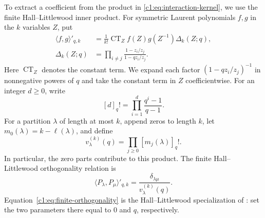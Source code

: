 \documentclass[12pt,reqno,a4paper]{amsart}
\numberwithin{equation}{section}
\numberwithin{figure}{section}
\theoremstyle{plain}
\theoremstyle{definition}
\begin{document}
To extract a coefficient from the product in \eqref{c1:eq:interaction-kernel},
we use the finite Hall--Littlewood inner product.  For symmetric
Laurent polynomials $f,g$ in the $k$ variables $Z$, put
\begin{equation}\label{c1:eq:finite-inner-product}
 \begin{aligned}
 \langle f,g\rangle'_{q,k}
 &=\frac1{k!}\operatorname{CT}_Z f(Z)g(Z^{-1})\Delta_k(Z;q),\\
 \Delta_k(Z;q)&=\prod_{i\ne j}\frac{1-z_i/z_j}{1-qz_i/z_j}.
 \end{aligned}
\end{equation}
Here $\operatorname{CT}_Z$ denotes the constant term.  We expand each
factor $(1-qz_i/z_j)^{-1}$ in nonnegative powers of $q$ and take the
constant term in $Z$ coefficientwise.
For an integer $d\geq0$, write
\[
 [d]_q!=\prod_{i=1}^d\frac{q^i-1}{q-1}.
\]
For a partition $\lambda$ of length at most $k$, append zeros to
length $k$, let $m_0(\lambda)=k-\ell(\lambda)$, and define
\[
 v_\lambda^{(k)}(q)
 =\prod_{j\geq0}[m_j(\lambda)]_q!.
\]
In particular, the zero parts contribute to this product.
The finite Hall--Littlewood orthogonality relation is
\begin{equation}\label{c1:eq:finite-orthogonality}
 \langle P_\lambda,P_\mu\rangle'_{q,k}
 =\frac{\delta_{\lambda\mu}}{v_\lambda^{(k)}(q)}.
\end{equation}
Equation~\eqref{c1:eq:finite-orthogonality} is the Hall--Littlewood
specialization of
\cite[Chapter~VI, (9.3), (9.5)--(9.7), the remark on p.~372, and \S9, Example~1(c)--(d)]{Macdonald}:
set the two parameters there equal to $0$ and $q$, respectively.
\end{document}
